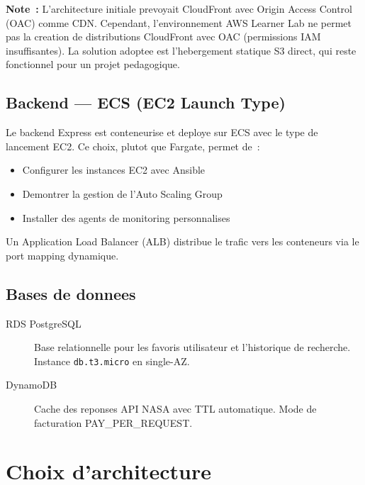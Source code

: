 \textbf{Note~:} L'architecture initiale prevoyait CloudFront avec Origin Access Control (OAC)
comme CDN. Cependant, l'environnement AWS Learner Lab ne permet pas la creation
de distributions CloudFront avec OAC (permissions IAM insuffisantes). La solution
adoptee est l'hebergement statique S3 direct, qui reste fonctionnel pour un projet
pedagogique.

\subsection{Backend --- ECS (EC2 Launch Type)}

Le backend Express est conteneurise et deploye sur ECS avec le type de lancement EC2.
Ce choix, plutot que Fargate, permet de~:
\begin{itemize}
    \item Configurer les instances EC2 avec Ansible
    \item Demontrer la gestion de l'Auto Scaling Group
    \item Installer des agents de monitoring personnalises
\end{itemize}

Un Application Load Balancer (ALB) distribue le trafic vers les conteneurs
via le port mapping dynamique.

\subsection{Bases de donnees}

\begin{description}
    \item[RDS PostgreSQL] Base relationnelle pour les favoris utilisateur et l'historique
        de recherche. Instance \texttt{db.t3.micro} en single-AZ.
    \item[DynamoDB] Cache des reponses API NASA avec TTL automatique.
        Mode de facturation PAY\_PER\_REQUEST.
\end{description}

\section{Choix d'architecture}

